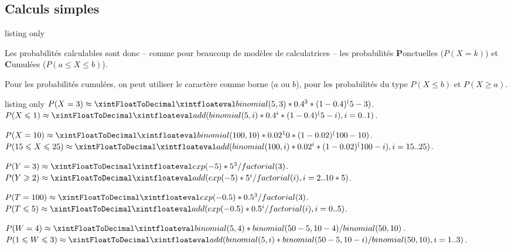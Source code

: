 \documentclass[a4paper,french,11pt]{article}
\newcommand\ctex[1]{\tcbox[vignettelatex]{#1}}
\begin{document}
\subsection{Calculs \og simples \fg}

\begin{PresCodeTexPL}{listing only}





\end{PresCodeTexPL}

\begin{cautionblock}
Les probabilités calculables sont donc -- comme pour beaucoup de modèles de calculatrices -- les probabilités \textbf{P}onctuelles ($P(X=k)$) et \textbf{C}umulées ($P(a\leqslant X\leqslant b)$).

\smallskip

Pour les probabilités cumulées, on peut utiliser le caractère \ctex{*} comme borne ($a$ ou $b$), pour les probabilités du type $P(X\leqslant b)$ et $P(X \geqslant a)$.
\end{cautionblock}

\begin{PresCodeTexPL}{listing only}
$P(X=3) \approx \CalcBinomP{5}{0.4}{3}$.
$P(X\leqslant1) \approx \CalcBinomC{5}{0.4}{*}{1}$.

$P(X=10) \approx \CalcBinomP{100}{0.02}{10}$.
$P(15\leqslant X\leqslant25) \approx \CalcBinomC{100}{0.02}{15}{25}$.

$P(Y=3) \approx \CalcPoissP{5}{3}$.
$P(Y\geqslant2) \approx \CalcPoissC{5}{2}{*}$.

$P(T=100) \approx \CalcPoissP{0.5}{3}$.
$P(T\leqslant5) \approx \CalcPoissC{0.5}{*}{5}$.

$P(W=4) \approx \CalcHypergeomP{50}{10}{5}{4}$.
$P(1\leqslant W\leqslant3) \approx \CalcHypergeomC{50}{10}{5}{1}{3}$.
\end{PresCodeTexPL}
\end{document}
